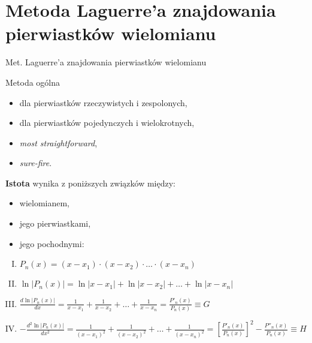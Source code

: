 \section{Metoda Laguerre'a znajdowania pierwiastków wielomianu}

\begin{frame}{Met. Laguerre'a znajdowania pierwiastków wielomianu}
  \begin{block}{Metoda ogólna}
    \begin{itemize}
      \item dla pierwiastków rzeczywistych i zespolonych,
      \item dla pierwiastków pojedynczych i wielokrotnych,
      \item \textit{most straightforward},
      \item \textit{sure-fire}.
    \end{itemize}
  \end{block}
\end{frame}

\begin{frame}
  \textbf{Istota} wynika z poniższych związków między:
  \begin{itemize}
    \item wielomianem,
    \item jego pierwiastkami,
    \item jego pochodnymi:
  \end{itemize}

  \begin{block}{}
    \begin{enumerate}[I.]
      \item $ P_n(x) = (x - x_1) \cdot (x - x_2) \cdot \ldots \cdot (x - x_n) $
      \item $ \ln|P_n(x)| = \ln|x - x_1| + \ln|x - x_2| + \ldots + \ln|x - x_n| $
      \item $ \frac{d \ln|P_n(x)|}{dx} = \frac{1}{x - x_1} + \frac{1}{x - x_2} + \ldots + \frac{1}{x - x_n} = \frac{P'_n(x)}{P_n(x)} \equiv G $
      \item $ -\frac{d^2 \ln|P_n(x)|}{dx^2} = \frac{1}{(x - x_1)^2} + \frac{1}{(x - x_2)^2} + \ldots + \frac{1}{(x - x_n)^2} = \left[ \frac{P'_n(x)}{P_n(x)} \right] ^2 - \frac{P''_n(x)}{P_n(x)} \equiv H $
    \end{enumerate}
  \end{block}
\end{frame}

